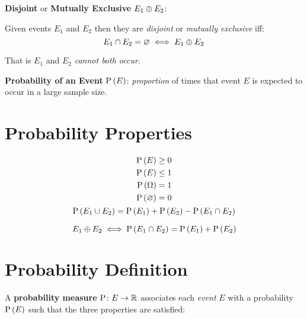 \textbf{Disjoint} or \textbf{Mutually Exclusive} $E_1 \oplus E_2$:

Given events $E_1$ and $E_2$ then they are \textit{disjoint} or \textit{mutually exclusive} iff:
\begin{equation*}
    E_1 \cap E_2 = \varnothing \iff E_1 \oplus E_2
\end{equation*}

That is $E_1$ and $E_2$ \textit{cannot both occur}.

\textbf{Probability of an Event} $\mathrm{P} \left( E \right)$: \textit{proportion} of times that event $E$ is expected to occur in a large sample size.

\section*{Probability Properties}

\begin{gather*}
    \begin{aligned}
        \mathrm{P} \left( E \right) &\ge 0 \\
        \mathrm{P} \left( E \right) &\le 1 \\
        \mathrm{P} \left( \Omega \right) &= 1 \\
        \mathrm{P} \left( \varnothing \right) &= 0
    \end{aligned} \\
    \mathrm{P} \left( E_1 \cup E_2 \right) = \mathrm{P} \left( E_1 \right) + \mathrm{P} \left( E_2 \right) - \mathrm{P} \left( E_1 \cap E_2 \right)
\end{gather*}

\begin{equation*}
    E_1 \oplus E_2 \iff \mathrm{P} \left( E_1 \cap E_2 \right) = \mathrm{P} \left( E_1 \right) + \mathrm{P} \left( E_2 \right)
\end{equation*}

\section*{Probability Definition}

A \textbf{probability measure} $\mathrm{P} \colon E \to \mathbb{R}$ associates each \textit{event} $E$ with a probability $\mathrm{P} \left( E \right)$ such that the three properties are satisfied:

